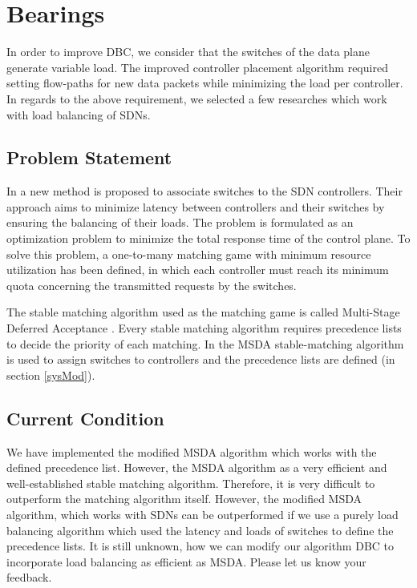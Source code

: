 \documentclass{article}
\begin{document}
	\section{Bearings}
	In order to improve DBC, we consider that the switches of the data plane generate variable load. The improved controller placement algorithm required setting flow-paths for new data packets while minimizing the load per controller. In regards to the above requirement, we selected a few researches which work with load balancing of SDNs.

	\subsection{Problem Statement}
	In \cite{filali2018} a new method is proposed to associate switches to the SDN controllers. Their approach aims to minimize latency \cite{yu2015software} between controllers and their switches by ensuring the balancing of their loads.
	The problem is formulated as an optimization problem to minimize the total response time of the control plane. To solve this problem, a one-to-many matching game with minimum resource utilization has been defined, in which each controller must reach its minimum quota concerning the transmitted requests by the switches.
	
	The stable matching algorithm used as the matching game is called Multi-Stage Deferred Acceptance \cite{acmFragiadakis2016}. Every stable matching algorithm requires precedence lists to decide the priority of each matching. In \cite{filali2018} the MSDA stable-matching algorithm is used to assign switches to controllers and the precedence lists are defined (in section \ref{sysMod}).
	
	\subsection{Current Condition}
	We have implemented the modified MSDA algorithm which works with the defined precedence list. However, the MSDA algorithm as a very efficient and well-established stable matching algorithm. Therefore, it is very difficult to outperform the matching algorithm itself. However, the modified MSDA algorithm, which works with SDNs can be outperformed if we use a purely load balancing algorithm which used the latency and loads of switches to define the precedence lists. It is still unknown, how we can modify our algorithm DBC to incorporate load balancing as efficient as MSDA. Please let us know your feedback.
\end{document}

